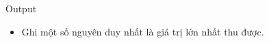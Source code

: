 Output
\begin{itemize}
	\item     Ghi một số nguyên duy nhất là giá trị lớn nhất thu được.   
\end{itemize}